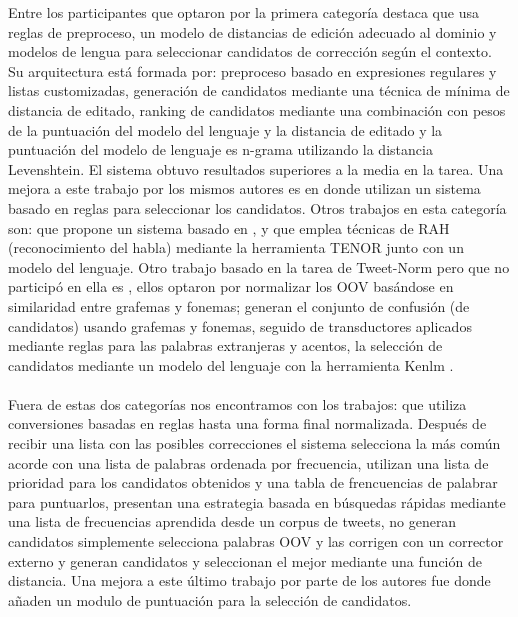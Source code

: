 \documentclass[spanish,12pt, a4paper,twoside]{paper}
\begin{document}
Entre los participantes que optaron por la primera categoría destaca \cite{ruizcuadros:2013}\cite{vicomtech} que usa reglas de preproceso, un modelo de distancias de edición adecuado al dominio y modelos de lengua para seleccionar candidatos de corrección según el contexto. Su arquitectura está formada por: preproceso basado en expresiones regulares y listas customizadas, generación de candidatos mediante una técnica de mínima de distancia de editado, ranking de candidatos mediante una combinación con pesos de la puntuación del modelo del lenguaje y la distancia de editado y la puntuación del modelo de lenguaje es n-grama utilizando la distancia Levenshtein. El sistema obtuvo resultados superiores a la media en la tarea. Una mejora a este trabajo por los mismos autores es \cite{ruizcuadros:2014} en donde utilizan un sistema basado en reglas para seleccionar los candidatos. Otros trabajos en esta categoría son: \cite{gamallo:2013} que propone un sistema basado en \cite{han:2013}, \cite{saralegi:2013} y \cite{mosqueralopezmoreda:2013} que emplea técnicas de RAH (reconocimiento del habla) mediante la herramienta TENOR \cite{mosquera:2012} junto con un modelo del lenguaje. Otro trabajo basado en la tarea de Tweet-Norm pero que no participó en ella es \cite{ceronguzman:2016}, ellos optaron por normalizar los OOV basándose en similaridad entre grafemas y fonemas; generan el conjunto de confusión (de candidatos) usando grafemas y fonemas, seguido de transductores aplicados mediante reglas para las palabras extranjeras y acentos, la selección de candidatos mediante un modelo del lenguaje con la herramienta Kenlm \cite{heafield:2011}.\\\\

Fuera de estas dos categorías nos encontramos con los trabajos: \cite{montejo:2013} que utiliza conversiones basadas en reglas hasta una forma final normalizada. Después de recibir una lista con las posibles correcciones el sistema selecciona la más común acorde con una lista de palabras ordenada por frecuencia, \cite{vilares:2013} utilizan una lista de prioridad para los candidatos obtenidos y una tabla de frencuencias de palabrar para puntuarlos, \cite{han:2013} presentan una estrategia basada en búsquedas rápidas mediante una lista de frecuencias aprendida desde un corpus de tweets, \cite{munozgarcia:2013} no generan candidatos simplemente selecciona palabras OOV y las corrigen con un corrector externo y \cite{cotelo:2013} generan candidatos y seleccionan el mejor mediante una función de distancia. Una mejora a este último trabajo por parte de los autores fue \cite{cotelocruz:2015} donde añaden un modulo de puntuación para la selección de candidatos. \\\\
\end{document}
